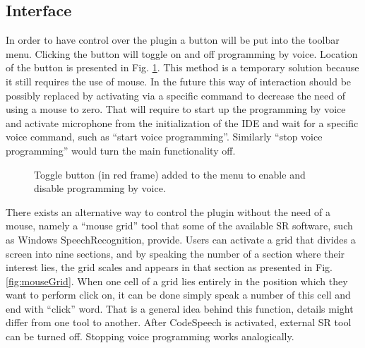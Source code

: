 \subsection{Interface}

In order to have control over the plugin a button will be put into the toolbar menu. Clicking the button will toggle on and off programming by voice. Location of the button is presented in Fig. \ref{fig:toggleButton}. This method is a temporary solution because it still requires the use of mouse. In the future this way of interaction should be possibly replaced by activating via a specific command to decrease the need of using a mouse to zero. That will require to start up the programming by voice and activate microphone from the initialization of the IDE and wait for a specific voice command, such as \eg ``start voice programming''. Similarly ``stop voice programming'' would turn the main functionality off.  

\begin{figure}[hbt!]
    \centering
    \caption{Toggle button (in red frame) added to the menu to enable and disable programming by voice.}
    \label{fig:toggleButton}
\end{figure}

There exists an alternative way to control the plugin without the need of a mouse, namely a ``mouse grid'' tool that some of the available SR software, such as Windows SpeechRecognition, provide. Users can activate a grid that divides a screen into nine sections, and by speaking the number of a section where their interest lies, the grid scales and appears in that section as presented in Fig. \ref{fig:mouseGrid}. When one cell of a grid lies entirely in the position which they want to perform click on, it can be done simply speak a number of this cell and end with ``click'' word. That is a general idea behind this function, details might differ from one tool to another. After CodeSpeech is activated, external SR tool can be turned off. Stopping voice programming works analogically.


